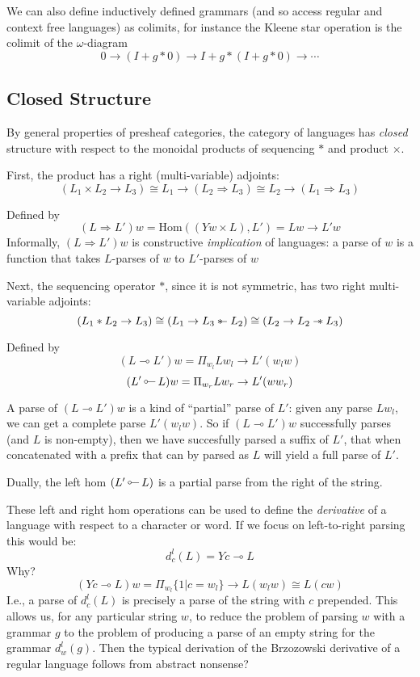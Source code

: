 \documentclass[12pt]{article}
\newcommand{\leftmultimap}{\mathop{\rotatebox[origin=c]{180}{$\multimap$}}}
\newcommand\rsepimp{\mathbin{-\mkern-6mu*}}
\newcommand\lsepimp{\mathbin{\rotatebox[origin=c]{180}{$-\mkern-6mu*$}}}
\newcommand\sepconj{\mathbin{*}}
\begin{document}
We can also define inductively defined grammars (and so access regular
and context free languages) as colimits, for instance the Kleene star
operation is the colimit of the $\omega$-diagram
\[ 0 \to (I + g * 0) \to I + g \sepconj (I + g \sepconj 0) \to \cdots \]

\subsection{Closed Structure}

By general properties of presheaf categories, the category of
languages has \emph{closed} structure with respect to the monoidal
products of sequencing $\sepconj$ and product $\times$.

First, the product has a right (multi-variable) adjoints:
\[ (L_1 \times L_2 \to  L_3) \cong L_1 \to (L_2 \Rightarrow L_3) \cong L_2 \to (L_1 \Rightarrow L_3) \]

Defined by
\[ (L \Rightarrow L')w = \textrm{Hom}((Y w \times L), L') = Lw \to L'w \]
Informally, $(L \Rightarrow L')w$ is constructive \emph{implication}
of languages: a parse of $w$ is a function that takes $L$-parses of
$w$ to $L'$-parses of $w$

Next, the sequencing operator $\sepconj$, since it is not symmetric, has
two right multi-variable adjoints:
\[ (L_1 \sepconj L_2 \to L_3) \cong (L_1 \to L_3 \lsepimp L_2) \cong (L_2 \to L_2 \rsepimp L_3) \]

Defined by
\[ (L \multimap L')w = \Pi_{w_l} L w_l \to L'(w_lw) \]
\[ (L' \leftmultimap L)w = \Pi_{w_r} L w_r \to L'(ww_r) \]

A parse of $(L \multimap L')w$ is a kind of ``partial'' parse of $L'$:
given any parse $L w_l$, we can get a complete parse $L' (w_lw)$. So
if $(L \multimap L') w$ successfully parses (and $L$ is non-empty),
then we have succesfully parsed a suffix of $L'$, that when
concatenated with a prefix that can by parsed as $L$ will yield a full
parse of $L'$.

Dually, the left hom $(L' \leftmultimap L)$ is a partial parse from
the right of the string.

These left and right hom operations can be used to define the
\emph{derivative} of a language with respect to a character or
word. If we focus on left-to-right parsing this would be:
\[ d^l_c(L) = Yc \multimap L \]
Why?
\[ (Yc \multimap L)w = \Pi_{w_l} \{ 1 | c = w_l \} \to L(w_lw) \cong L(cw) \]
I.e., a parse of $d^l_c(L)$ is precisely a parse of the string with
$c$ prepended.
%
This allows us, for any particular string $w$, to reduce the problem
of parsing $w$ with a grammar $g$ to the problem of producing a parse
of an empty string for the grammar $d^l_w(g)$. Then the typical
derivation of the Brzozowski derivative of a regular language follows
from abstract nonsense?
\end{document}
